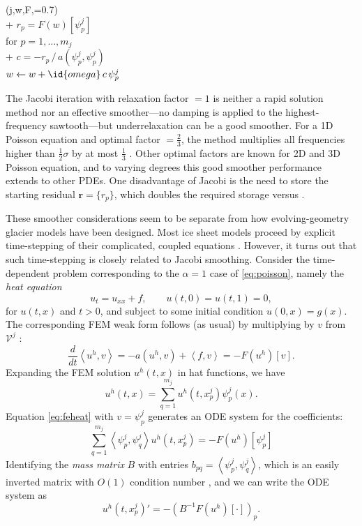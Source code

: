 \documentclass[letterpaper,final,12pt,reqno]{amsart}
\theoremstyle{claim}
\newcommand{\br}{\mathbf{r}}
\newcommand{\ip}[2]{\left<#1,#2\right>}
\numberwithin{equation}{section}
\numberwithin{figure}{section}
\numberwithin{table}{section}
\numberwithin{theorem}{section}
\begin{document}
\begin{pseudo*} \label{ps:jacobi-sweep}
(j,w,F,=0.7)\text{:} \\+
    $r_p = F(w)[\psi_p^j]$ \qquad\qquad\qquad\qquad {} \\
    for $p=1,\dots,m_j$ \\+
        $\displaystyle c = - r_p \, \big/ \, a(\psi_p^j,\psi_p^j)$  \\
        $w \gets w + \id{omega} \,c \,\psi_p^j$
\end{pseudo*}

The Jacobi iteration with relaxation factor  $=1$ is neither a rapid solution method nor an effective smoother---no damping is applied to the highest-frequency sawtooth---but underrelaxation can be a good smoother.  For a 1D Poisson equation and optimal factor  $=\frac{2}{3}$, the method multiplies all frequencies higher than $\frac{1}{2} \sigma$ by at most $\frac{1}{3}$ \cite[Chapter 4]{Briggsetal2000}.  Other optimal factors are known for 2D and 3D Poisson equation, and to varying degrees this good smoother performance extends to other PDEs.  One disadvantage of Jacobi is the need to store the starting residual $\br = \{r_p\}$, which doubles the required storage versus .

These smoother considerations seem to be separate from how evolving-geometry glacier models have been designed.  Most ice sheet models proceed by explicit time-stepping of their complicated, coupled equations \cite[for example]{Winkelmannetal2011}.  However, it turns out that such time-stepping is closely related to Jacobi smoothing.  Consider the time-dependent problem corresponding to the $\alpha=1$ case of \eqref{eq:poisson}, namely the \emph{heat equation}
\begin{equation}
u_t = u_{xx} + f, \qquad u(t,0)=u(t,1)=0, \label{eq:heat}
\end{equation}
for $u(t,x)$ and $t>0$, and subject to some initial condition $u(0,x)=g(x)$.  The corresponding FEM weak form follows (as usual) by multiplying by $v$ from $\mathcal{V}^j$ \cite[Chapter 8]{Johnson2009}:
\begin{equation}
\frac{d}{dt}\ip{u^h}{v} = -a(u^h,v) + \ip{f}{v} = - F(u^h)[v]. \label{eq:feheat}
\end{equation}
Expanding the FEM solution $u^h(t,x)$ in hat functions, we have
\begin{equation}
u^h(t,x) = \sum_{q=1}^{m_j} u^h(t,x_p^j) \psi_p^j(x). \label{eq:trialheat}
\end{equation}
Equation \eqref{eq:feheat} with $v=\psi_p^j$ generates an ODE system for the coefficients:
\begin{equation}
\sum_{q=1}^{m_j} \ip{\psi_p^j}{\psi_q^j} u^h(t,x_p^j) = - F(u^h)[\psi_p^j] \label{eq:odeheatearly}
\end{equation}
Identifying the \emph{mass matrix} $B$ with entries $b_{pq} = \ip{\psi_p^j}{\psi_q^j}$, which is an easily inverted matrix with $O(1)$ condition number \cite{Elmanetal2014}, and we can write the ODE system as
\begin{equation}
u^h(t,x_p^j)' = - (B^{-1} F(u^h)[\cdot])_p. \label{eq:odeheat}
\end{equation}
\end{document}

